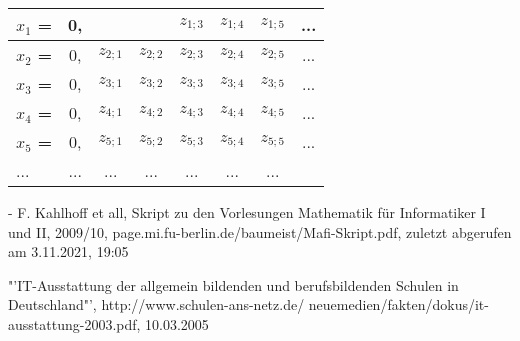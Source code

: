 \documentclass[12pt]{article}
\begin{document}
	\begin{table}
		\begin{center}
			\begin{tabular}{l|c|c|c|c|c|c|c}
				\textbf{$x_1$ =} & 0, & {\color{blue}$z_{1;1}$ &} $z_{1;2}$ & $z_{1;3}$ & $z_{1;4}$ & $z_{1;5}$ & ... \\
				\hline
				\textbf{$x_2$ =} & 0, & $z_{2;1}$ & {\color{blue}$z_{2;2}$} & $z_{2;3}$ & $z_{2;4}$ & $z_{2;5}$ & ... \\
				\hline
				\textbf{$x_3$ =} & 0, & $z_{3;1}$ & $z_{3;2}$ & {\color{blue}$z_{3;3}$} & $z_{3;4}$ & $z_{3;5}$ & ... \\
				\hline
				\textbf{$x_4$ =} & 0, & $z_{4;1}$ & $z_{4;2}$ & $z_{4;3}$ & {\color{blue}$z_{4;4}$} & $z_{4;5}$ & ... \\
				\hline
				\textbf{$x_5$ =} & 0, & $z_{5;1}$ & $z_{5;2}$ & $z_{5;3}$ & $z_{5;4}$ & {\color{blue}$z_{5;5}$} & ... \\
				\hline
				... & ... & ... & ... & ... & ... & ... & \\
			\end{tabular}
		\end{center}
	\end{table}

    \newpage

    \appendix

    \newpage
		
		- F. Kahlhoff et all, Skript zu den Vorlesungen Mathematik für Informatiker I und II, 2009/10, 
			page.mi.fu-berlin.de/baumeist/Mafi-Skript.pdf, zuletzt abgerufen am 3.11.2021, 19:05

    \begin{thebibliography}{xxxxxxxxxxxxxxxxxxx}
       "'IT-Ausstattung der allgemein bildenden und berufsbildenden
                                   Schulen in Deutschland"', http://www.schulen-ans-netz.de/
                                   neuemedien/fakten/dokus/it-ausstattung-2003.pdf, 10.03.2005
    \end{thebibliography}

    \newpage

\end{document}

